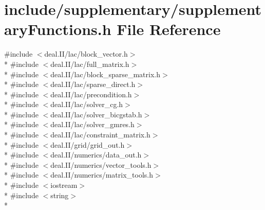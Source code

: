 \section{include/supplementary/supplementary\-Functions.h File Reference}
\label{supplementary_functions_8h}
{\ttfamily \#include $<$deal.\-I\-I/lac/block\-\_\-vector.\-h$>$}\\*
{\ttfamily \#include $<$deal.\-I\-I/lac/full\-\_\-matrix.\-h$>$}\\*
{\ttfamily \#include $<$deal.\-I\-I/lac/block\-\_\-sparse\-\_\-matrix.\-h$>$}\\*
{\ttfamily \#include $<$deal.\-I\-I/lac/sparse\-\_\-direct.\-h$>$}\\*
{\ttfamily \#include $<$deal.\-I\-I/lac/precondition.\-h$>$}\\*
{\ttfamily \#include $<$deal.\-I\-I/lac/solver\-\_\-cg.\-h$>$}\\*
{\ttfamily \#include $<$deal.\-I\-I/lac/solver\-\_\-bicgstab.\-h$>$}\\*
{\ttfamily \#include $<$deal.\-I\-I/lac/solver\-\_\-gmres.\-h$>$}\\*
{\ttfamily \#include $<$deal.\-I\-I/lac/constraint\-\_\-matrix.\-h$>$}\\*
{\ttfamily \#include $<$deal.\-I\-I/grid/grid\-\_\-out.\-h$>$}\\*
{\ttfamily \#include $<$deal.\-I\-I/numerics/data\-\_\-out.\-h$>$}\\*
{\ttfamily \#include $<$deal.\-I\-I/numerics/vector\-\_\-tools.\-h$>$}\\*
{\ttfamily \#include $<$deal.\-I\-I/numerics/matrix\-\_\-tools.\-h$>$}\\*
{\ttfamily \#include $<$iostream$>$}\\*
{\ttfamily \#include $<$string$>$}\\*
